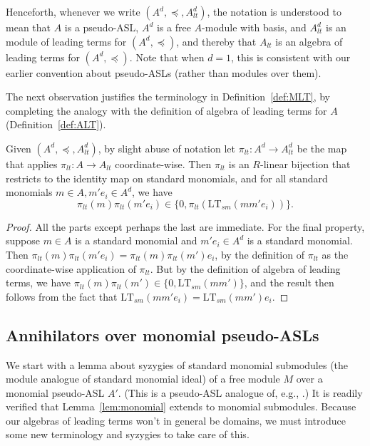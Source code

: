 \documentclass[11pt,reqno]{amsart}
\newcommand{\ltsm}{\text{LT}_{sm}}
\newcommand{\piltd}{\pi_{lt}}
\theoremstyle{definition}
\numberwithin{equation}{section}
\begin{document}
\begin{convention}
Henceforth, whenever we write $(A^d, \preceq, A_{lt}^d)$, the notation is understood to mean that $A$ is a pseudo-ASL, $A^d$ is a free $A$-module with basis, and $A_{lt}^d$ is an module of leading terms for $(A^d, \preceq)$, and thereby that $A_{lt}$ is an algebra of leading terms for $(A^d, \preceq)$. Note that when $d=1$, this is consistent with our earlier convention about pseudo-ASLs (rather than modules over them). 
\end{convention}

The next observation justifies the terminology in Definition~\ref{def:MLT}, by completing the analogy with the definition of algebra of leading terms for $A$ (Definition~\ref{def:ALT}).

\begin{observation}[store=obsmlt, note={Module of leading terms}]
\label{obs:mlt}
Given $(A^d, \preceq, A_{lt}^d)$, by slight abuse of notation let $\piltd \colon A^d \to A_{lt}^d$ be the map that applies $\pi_{lt} \colon A \to A_{lt}$ coordinate-wise. Then $\piltd$ is an $R$-linear bijection that restricts to the identity map on standard monomials, and for all standard monomials $m \in A, m' e_i \in A^d$, we have
\[
\pi_{lt}(m) \piltd(m' e_i) \in \{0, \piltd(\ltsm(mm' e_i))\}.
\]
\end{observation}

\begin{proof}
All the parts except perhaps the last are immediate. For the final property, suppose $m \in A$ is a standard monomial and $m' e_i \in A^d$ is a standard monomial. Then $\pi_{lt}(m) \piltd(m' e_i) = \pi_{lt}(m)\pi_{lt}(m') e_i$, by the definition of $\piltd$ as the coordinate-wise application of $\pi_{lt}$. But by the definition of algebra of leading terms, we have $\pi_{lt}(m) \pi_{lt}(m') \in \{0, \ltsm(mm')\}$, and the result then follows from the fact that $\ltsm(mm' e_i) = \ltsm(mm') e_i$. 
\end{proof}

\subsection{Annihilators over monomial pseudo-ASLs}

We start with a lemma about syzygies of standard monomial submodules (the module analogue of standard monomial ideal) of a free module $M$ over a monomial pseudo-ASL $A'$. (This is a pseudo-ASL analogue of, e.g., \cite[Lemma~15.1]{eisenbud}.)
It is readily verified that Lemma~\ref{lem:monomial} extends to monomial submodules.  Because our algebras of leading terms won't in general be domains, we must introduce some new terminology and syzygies to take care of this. 
\end{document}
